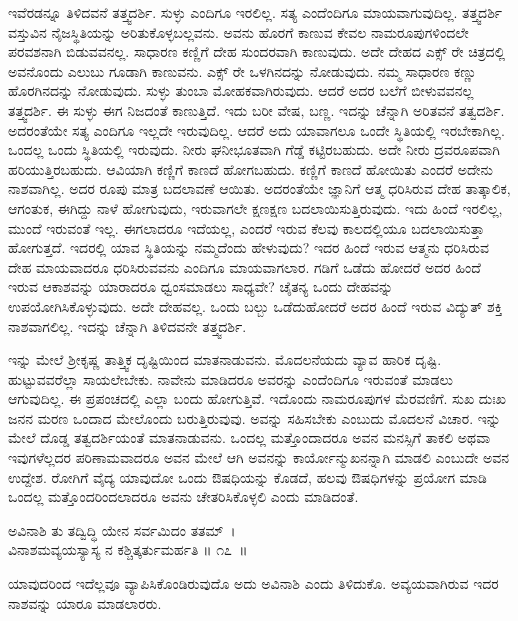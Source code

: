 ಇವೆರಡನ್ನೂ ತಿಳಿದವನೆ ತತ್ತ್ವದರ್ಶಿ. ಸುಳ್ಳು ಎಂದಿಗೂ ಇರಲಿಲ್ಲ. ಸತ್ಯ ಎಂದೆಂದಿಗೂ ಮಾಯವಾಗುವುದಿಲ್ಲ. ತತ್ತ್ವದರ್ಶಿ ವಸ್ತುವಿನ ನೈಜಸ್ಥಿತಿಯನ್ನು ಅರಿತುಕೊಳ್ಳಬಲ್ಲವನು. ಅವನು ಹೊರಗೆ ಕಾಣುವ ಕೇವಲ ನಾಮರೂಪುಗಳಿಂದಲೇ ಪರವಶನಾಗಿ ಬಿಡುವವನಲ್ಲ. ಸಾಧಾರಣ ಕಣ್ಣಿಗೆ ದೇಹ ಸುಂದರವಾಗಿ ಕಾಣುವುದು. ಅದೇ ದೇಹದ ಎಕ್ಸ್ ರೇ ಚಿತ್ರದಲ್ಲಿ ಅವನೊಂದು ಎಲುಬು ಗೂಡಾಗಿ ಕಾಣುವನು. ಎಕ್ಸ್ ರೇ ಒಳಗಿನದನ್ನು ನೋಡುವುದು. ನಮ್ಮ ಸಾಧಾರಣ ಕಣ್ಣು ಹೊರಗಿನದನ್ನು ನೋಡುವುದು. ಸುಳ್ಳು ತುಂಬಾ ಮೋಹಕವಾಗಿರುವುದು. ಆದರೆ ಅದರ ಬಲೆಗೆ ಬೀಳುವವನಲ್ಲ ತತ್ತ್ವದರ್ಶಿ. ಈ ಸುಳ್ಳು ಈಗ ನಿಜದಂತೆ ಕಾಣುತ್ತಿದೆ. ಇದು ಬರೀ ವೇಷ, ಬಣ್ಣ. ಇದನ್ನು ಚೆನ್ನಾಗಿ ಅರಿತವನೆ ತತ್ವದರ್ಶಿ. ಅದರಂತೆಯೇ ಸತ್ಯ ಎಂದಿಗೂ ಇಲ್ಲದೇ ಇರುವುದಿಲ್ಲ. ಆದರೆ ಅದು ಯಾವಾಗಲೂ ಒಂದೇ ಸ್ಥಿತಿಯಲ್ಲಿ ಇರಬೇಕಾಗಿಲ್ಲ. ಒಂದಲ್ಲ ಒಂದು ಸ್ಥಿತಿಯಲ್ಲಿ ಇರುವುದು. ನೀರು ಘನೀಭೂತವಾಗಿ ಗೆಡ್ಡೆ ಕಟ್ಟಿರಬಹುದು. ಅದೇ ನೀರು ದ್ರವರೂಪವಾಗಿ ಹರಿಯುತ್ತಿರಬಹುದು. ಆವಿಯಾಗಿ ಕಣ್ಣಿಗೆ ಕಾಣದೆ ಹೋಗಬಹುದು. ಕಣ್ಣಿಗೆ ಕಾಣದೆ ಹೋಯಿತು ಎಂದರೆ ಅದೇನು ನಾಶವಾಗಿಲ್ಲ. ಅದರ ರೂಪು ಮಾತ್ರ ಬದಲಾವಣೆ ಆಯಿತು. ಅದರಂತೆಯೇ ಜ್ಞಾನಿಗೆ ಆತ್ಮ ಧರಿಸಿರುವ ದೇಹ ತಾತ್ಕಾಲಿಕ, ಆಗಂತುಕ, ಈಗಿದ್ದು ನಾಳೆ ಹೋಗುವುದು, ಇರುವಾಗಲೇ ಕ್ಷಣಕ್ಷಣ ಬದಲಾಯಿಸುತ್ತಿರುವುದು. ಇದು ಹಿಂದೆ ಇರಲಿಲ್ಲ, ಮುಂದೆ ಇರುವಂತೆ ಇಲ್ಲ. ಈಗಲಾದರೂ ಇದೆಯಲ್ಲ, ಎಂದರೆ ಇರುವ ಕೆಲವು ಕಾಲದಲ್ಲಿಯೂ ಬದಲಾಯಿಸುತ್ತಾ ಹೋಗುತ್ತದೆ. ಇದರಲ್ಲಿ ಯಾವ ಸ್ಥಿತಿಯನ್ನು ನಮ್ಮದೆಂದು ಹೇಳುವುದು? ಇದರ ಹಿಂದೆ ಇರುವ ಆತ್ಮನು ಧರಿಸಿರುವ ದೇಹ ಮಾಯವಾದರೂ ಧರಿಸಿರುವವನು ಎಂದಿಗೂ ಮಾಯವಾಗಲಾರ. ಗಡಿಗೆ ಒಡೆದು ಹೋದರೆ ಅದರ ಹಿಂದೆ ಇರುವ ಆಕಾಶವನ್ನು ಯಾರಾದರೂ ಧ್ವಂಸಮಾಡಲು ಸಾಧ್ಯವೇ? ಚೈತನ್ಯ ಒಂದು ದೇಹವನ್ನು ಉಪಯೋಗಿಸಿಕೊಳ್ಳುವುದು. ಅದೇ ದೇಹವಲ್ಲ. ಒಂದು ಬಲ್ಬು ಒಡೆದುಹೋದರೆ ಅದರ ಹಿಂದೆ ಇರುವ ವಿದ್ಯುತ್ ಶಕ್ತಿ ನಾಶವಾಗಲಿಲ್ಲ. ಇದನ್ನು ಚೆನ್ನಾಗಿ ತಿಳಿದವನೇ ತತ್ತ್ವದರ್ಶಿ.

ಇನ್ನು ಮೇಲೆ ಶ‍್ರೀಕೃಷ್ಣ ತಾತ್ತ್ವಿಕ ದೃಷ್ಟಿಯಿಂದ ಮಾತನಾಡುವನು. ಮೊದಲನೆಯದು ವ್ಯಾವ ಹಾರಿಕ ದೃಷ್ಟಿ. ಹುಟ್ಟುವವರೆಲ್ಲಾ ಸಾಯಲೇಬೇಕು. ನಾವೇನು ಮಾಡಿದರೂ ಅವರನ್ನು ಎಂದೆಂದಿಗೂ ಇರುವಂತೆ ಮಾಡಲು ಆಗುವುದಿಲ್ಲ. ಈ ಪ್ರಪಂಚದಲ್ಲಿ ಎಲ್ಲಾ ಬಂದು ಹೋಗುತ್ತಿವೆ. ಇದೊಂದು ನಾಮರೂಪುಗಳ ಮೆರವಣಿಗೆ. ಸುಖ ದುಃಖ ಜನನ ಮರಣ ಒಂದಾದ ಮೇಲೊಂದು ಬರುತ್ತಿರುವುವು. ಅವನ್ನು ಸಹಿಸಬೇಕು ಎಂಬುದು ಮೊದಲನೆ ವಿಚಾರ. ಇನ್ನು ಮೇಲೆ ದೊಡ್ಡ ತತ್ವದರ್ಶಿಯಂತೆ ಮಾತನಾಡುವನು. ಒಂದಲ್ಲ ಮತ್ತೊಂದಾದರೂ ಅವನ ಮನಸ್ಸಿಗೆ ತಾಕಲಿ ಅಥವಾ ಇವುಗಳೆಲ್ಲದರ ಪರಿಣಾಮವಾದರೂ ಅವನ ಮೇಲೆ ಆಗಿ ಅವನನ್ನು ಕಾರ್ಯೋನ್ಮುಖ\-ನನ್ನಾಗಿ ಮಾಡಲಿ ಎಂಬುದೇ ಅವನ ಉದ್ದೇಶ. ರೋಗಿಗೆ ವೈದ್ಯ ಯಾವುದೋ ಒಂದು ಔಷಧಿಯನ್ನು ಕೊಡದೆ, ಹಲವು ಔಷಧಿಗಳನ್ನು ಪ್ರಯೋಗ ಮಾಡಿ ಒಂದಲ್ಲ ಮತ್ತೊಂದರಿಂದಲಾದರೂ ಅವನು ಚೇತರಿಸಿಕೊಳ್ಳಲಿ ಎಂದು ಮಾಡಿದಂತೆ.

\begin{shloka}
ಅವಿನಾಶಿ ತು ತದ್ವಿದ್ಧಿ ಯೇನ ಸರ್ವಮಿದಂ ತತಮ್~।\\ವಿನಾಶಮವ್ಯಯಸ್ಯಾಸ್ಯ ನ ಕಶ್ಚಿತ್ಕರ್ತುಮರ್ಹತಿ \hfill॥ ೧೭~॥
\end{shloka}

\begin{artha}
ಯಾವುದರಿಂದ ಇದೆಲ್ಲವೂ ವ್ಯಾಪಿಸಿಕೊಂಡಿರುವುದೊ ಅದು ಅವಿನಾಶಿ ಎಂದು ತಿಳಿದುಕೊ. ಅವ್ಯಯವಾಗಿರುವ ಇದರ ನಾಶವನ್ನು ಯಾರೂ ಮಾಡಲಾರರು.
\end{artha}

